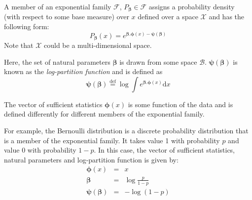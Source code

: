 \documentclass{article}
\newcommand{\family}{\mathcal F}
\newcommand{\betavec}{\pmb{\beta}}
\newcommand{\lpf}{\mathbf{\psi}} %
\newcommand{\suff}{\pmb{\phi}} %
\newcommand{\defeq}{\stackrel{\mathrm{def}}{=}}
\begin{document}
A member of an exponential family $\family$, $P_{\betavec} \in \family$ assigns a probability density (with respect to some base measure) over $x$ defined over a space $\mathcal{X}$ and has the following form: 
\[
  P_{\betavec}(x) = e^{\betavec . \suff(x) -\lpf(\betavec)}
\]
Note that $\mathcal{X}$ could be a multi-dimensional space.

Here, the set of natural parameters $\betavec$ is drawn from some space $\mathcal{B}$. $\lpf(\betavec)$ is known as the {\em log-partition function} and is defined as 
 $$\lpf(\betavec)\defeq\log\int e^{\betavec . \suff(x)}\mbox{d}x$$
 
The vector of sufficient statistics $\suff(x)$ is some function of the data and is defined differently for different members of the exponential family. 

For example, the Bernoulli distribution is a discrete probability distribution that is a member of the exponential family. It takes value 1 with  probability $p$ and value 0 with  probability $1-p$. In this case, the vector of sufficient statistics,  natural parameters and log-partition function is given by:
\begin{eqnarray*}
\suff(x)&=&x\\
\betavec&=&\log\frac{p}{1-p}\\
\lpf(\betavec)&=&-\log(1-p)
\end{eqnarray*}

%
\end{document}
